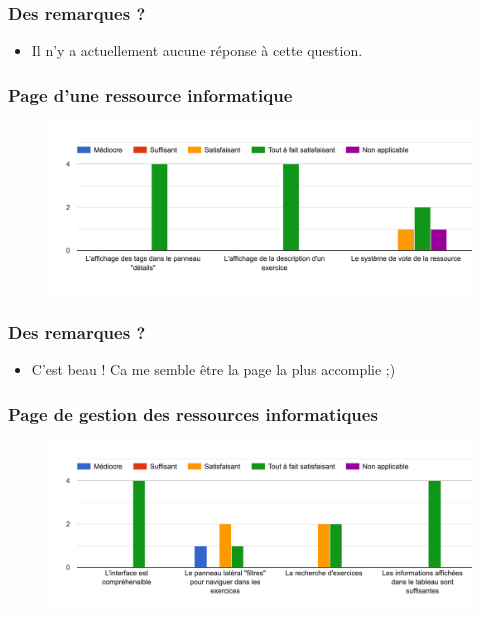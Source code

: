 \subsubsection*{Des remarques ?}

\begin{itemize}
    \item Il n'y a actuellement aucune réponse à cette question.
\end{itemize}


\subsubsection*{Page d'une ressource informatique}

\begin{figure}[H]
    \includegraphics[width=\textwidth,height=0.3\textheight,keepaspectratio]{images/googleForm/resinfo_2.png}
    \centering
\end{figure}

\subsubsection*{Des remarques ?}

\begin{itemize}
    \item C'est beau ! Ca me semble être la page la plus accomplie ;)
\end{itemize}


\subsubsection*{Page de gestion des ressources informatiques}

\begin{figure}[H]
    \includegraphics[width=\textwidth,height=0.3\textheight,keepaspectratio]{images/googleForm/gestionResInfo_2.png}
    \centering
\end{figure}

